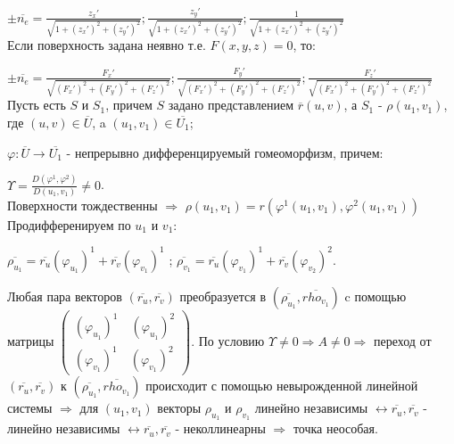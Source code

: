 $\pm \overline{n_e} = \frac {z_x'}{\sqrt{1 + (z_x')^2 +(z_y')^2}}; \frac {z_y'}{\sqrt{1 + (z_x')^2 +(z_y')^2}};\frac {1}{\sqrt{1 + (z_x')^2 +(z_y')^2}}$
\\
Если поверхность задана неявно т.е. $F(x,y,z) = 0$, то:

$\pm \overline{n_e} = \frac {F_x'}{\sqrt{(F_x')^2 +(F_y')^2+(F_z')^2}}; \frac {F_y'}{\sqrt{(F_x')^2 +(F_y')^2+(F_z')^2}};\frac {F_z'}{\sqrt{(F_x')^2 +(F_y')^2+(F_z')^2}}$
\\
Пусть есть $S$ и $S_1$, причем $S$ задано представлением $\overline{r}(u,v)$, а $S_1$ - $\rho(u_1,v_1)$, где $(u,v) \in \overline{U}$, a $(u_1,v_1) \in \overline{U_1}$;

$\varphi : \overline{U} \rightarrow \overline{U_1}$ - непрерывно дифференцируемый гомеоморфизм, причем:

$\Upsilon = \frac {D(\varphi^1,\varphi^2)}{D(u_1,v_1)} \neq 0$.
\\
Поверхности тождественны $\Rightarrow$ $\rho(u_1,v_1) = r(\varphi^1(u_1,v_1),\varphi^2(u_1,v_1))$
\\
Продифференируем по $u_1$ и $v_1$:

$\overline{\rho_{u_1}}= \overline{r_u}(\varphi_{u_1})^1 + \overline{r_v}(\varphi_{v_1})^1 $ ; $\overline{\rho_{v_1}}= \overline{r_u}(\varphi_{v_1})^1 + \overline{r_v}(\varphi_{v_2})^2 $.

Любая пара векторов $(\overline{r_u},\overline{r_v})$ преобразуется в $(\overline{\rho_{u_1}},\overline{rho_{v_1}})$ c помощью матрицы
$\left(
  \begin{array}{ccc}
(\varphi_{u_1})^1 \quad (\varphi_{u_1})^2
\\
(\varphi_{v_1})^1 \quad (\varphi_{v_1})^2
  \end{array}
\right)$.
По условию $\Upsilon \neq 0 \Rightarrow A \neq 0 \Rightarrow$ переход от $(\overline{r_u},\overline{r_v})$ к $(\overline{\rho_{u_1}},\overline{rho_{v_1}})$ происходит с помощью невырожденной линейной системы $\Rightarrow$ для $(u_1,v_1)$ векторы $\rho_{u_1}$ и $\rho_{v_1}$ линейно независимы $\leftrightarrow \overline{r_u},\overline{r_v}$ - линейно независимы $\leftrightarrow \overline{r_u},\overline{r_v}$ - неколлинеарны $\Rightarrow$ точка неособая.
